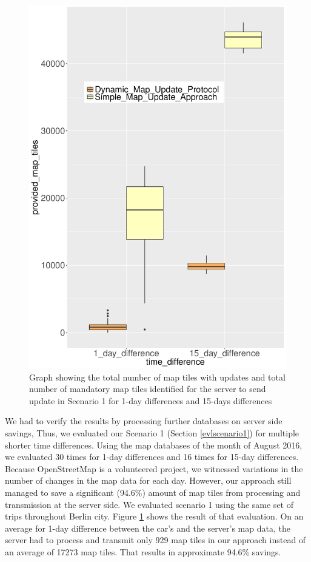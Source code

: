 \begin{figure}
\centering
\includegraphics[scale=.7]{MapTiles1dvs15DP.pdf}
\caption{Graph showing the total number of map tiles with updates and total number of mandatory map tiles identified for the server to send update in Scenario 1 for 1-day differences and 15-days differences}
\label{fg:scenario11dv15d}
\end{figure}



We had to verify the results by processing further databases on server side savings, Thus, we evaluated our Scenario 1 (Section \ref{evlscenario1}) for multiple shorter time differences. Using the map databases of the month of August 2016, we evaluated 30 times for 1-day differences and 16 times for 15-day differences. Because OpenStreetMap is a volunteered project, we witnessed variations in the number of changes in the map data for each day. However, our approach still managed to save a significant (94.6\%) amount of map tiles from processing and transmission at the server side. We evaluated scenario 1 using the same set of trips throughout Berlin city. Figure \ref{fg:scenario11dv15d} shows the result of that evaluation. On an average for 1-day difference between the car's and the server's map data, the server had to process and transmit only 929 map tiles in our approach instead of an average of 17273 map tiles. That results in approximate 94.6\% savings. \\


